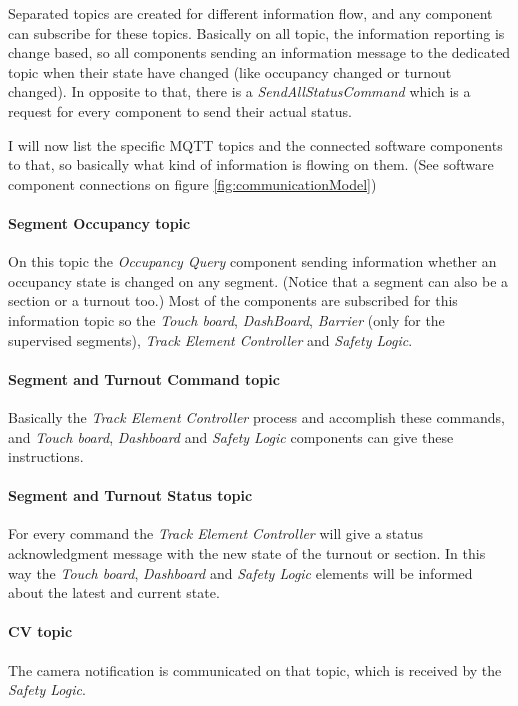 Separated topics are created for different information flow, and any component can subscribe for these topics. Basically on all topic, the information reporting is change based, so all components sending an information message to the dedicated topic when their state have changed (like occupancy changed or turnout changed). In opposite to that, there is a \textit{SendAllStatusCommand} which is a request for every component to send their actual status.

I will now list the specific MQTT topics and the connected software components to that, so basically what kind of information is flowing on them. (See software component connections on figure \ref{fig:communicationModel})

\paragraph{Segment Occupancy topic}
On this topic the \textit{Occupancy Query} component sending information whether an occupancy state is changed on any segment. (Notice that a segment can also be a section or a turnout too.) Most of the components are subscribed for this information topic so the \textit{Touch board}, \textit{DashBoard}, \textit{Barrier} (only for the supervised segments), \textit{Track Element Controller} and \textit{Safety Logic}.

\paragraph{Segment and Turnout Command topic}\label{par:MQTTTopicCommand}
Basically the \textit{Track Element Controller} process and accomplish these commands, and \textit{Touch board}, \textit{Dashboard} and \textit{Safety Logic} components can give these instructions.

\paragraph{Segment and Turnout Status topic}\label{par:MQTTTopicStatus}
For every command the \textit{Track Element Controller} will give a status acknowledgment message with the new state of the turnout or section. In this way the \textit{Touch board}, \textit{Dashboard} and \textit{Safety Logic} elements will be informed about the latest and current state.

\paragraph{CV topic}
The camera notification is communicated on that topic, which is received by the \textit{Safety Logic}.

